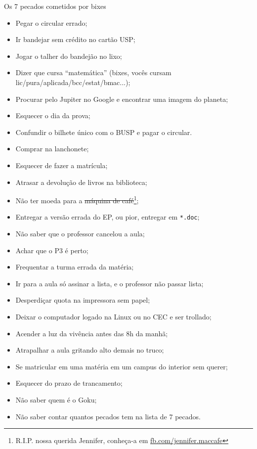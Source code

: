 \begin{editorial}{Os 7 pecados cometidos por bixes}

\begin{itemize}
  \item Pegar o circular errado;
  \item Ir bandejar sem crédito no cartão USP;
  \item Jogar o talher do bandejão no lixo;
  \item Dizer que cursa ``matemática'' (bixes, vocês cursam
        lic/pura/aplicada/bcc/estat/bmac...);
  \item Procurar pelo Jupiter no Google e encontrar uma imagem do planeta;
  \item Esquecer o dia da prova;
  \item Confundir o bilhete único com o BUSP e pagar o circular.
  \item Comprar na lanchonete;
  \item Esquecer de fazer a matrícula;
  \item Atrasar a devolução de livros na biblioteca;
  \item Não ter moeda para a \sout{máquina de café}\footnote{R.I.P. nossa querida Jennifer,
    conheça-a em \url{fb.com/jennifer.maccafe}};
  \item Entregar a versão errada do EP, ou pior, entregar em \texttt{*.doc};
  \item Não saber que o professor cancelou a aula;
  \item Achar que o P3 é perto;
  \item Frequentar a turma errada da matéria;
  \item Ir para a aula só assinar a lista, e o professor não passar lista;
  \item Desperdiçar quota na impressora sem papel;
  \item Deixar o computador logado na Linux ou no CEC e ser trollado;
  \item Acender a luz da vivência antes das 8h da manhã;
  \item Atrapalhar a aula gritando alto demais no truco;
  \item Se matricular em uma matéria em um campus do interior sem querer;
  \item Esquecer do prazo de trancamento;
  \item Não saber quem é o Goku;
  \item Não saber contar quantos pecados tem na lista de 7 pecados.
\end{itemize}

\end{editorial}
